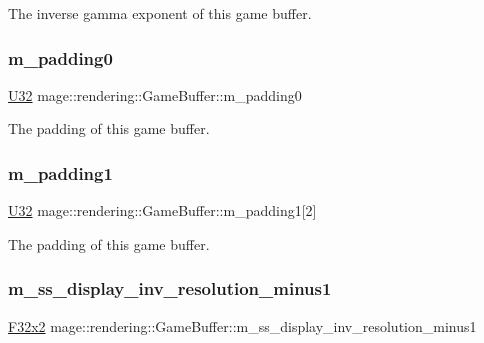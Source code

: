 The inverse gamma exponent of this game buffer. \hypertarget{structmage_1_1rendering_1_1_game_buffer_ac0e92071c7409a5408047bd6116da200}{}\label{structmage_1_1rendering_1_1_game_buffer_ac0e92071c7409a5408047bd6116da200} 
\subsubsection{\texorpdfstring{m\+\_\+padding0}{m\_padding0}}
{\footnotesize\ttfamily \hyperlink{namespacemage_a41c104c036fba3756a74e19f793eeaa1}{U32} mage\+::rendering\+::\+Game\+Buffer\+::m\+\_\+padding0}

The padding of this game buffer. \hypertarget{structmage_1_1rendering_1_1_game_buffer_a235dc002359e2106b4aee25e07470da8}{}\label{structmage_1_1rendering_1_1_game_buffer_a235dc002359e2106b4aee25e07470da8} 
\subsubsection{\texorpdfstring{m\+\_\+padding1}{m\_padding1}}
{\footnotesize\ttfamily \hyperlink{namespacemage_a41c104c036fba3756a74e19f793eeaa1}{U32} mage\+::rendering\+::\+Game\+Buffer\+::m\+\_\+padding1\mbox{[}2\mbox{]}}

The padding of this game buffer. \hypertarget{structmage_1_1rendering_1_1_game_buffer_a471b606cff83755f74f855c780c3dc2a}{}\label{structmage_1_1rendering_1_1_game_buffer_a471b606cff83755f74f855c780c3dc2a} 
\subsubsection{\texorpdfstring{m\+\_\+ss\+\_\+display\+\_\+inv\+\_\+resolution\+\_\+minus1}{m\_ss\_display\_inv\_resolution\_minus1}}
{\footnotesize\ttfamily \hyperlink{namespacemage_aa87237ad091f5cd7da612b8523fc108f}{F32x2} mage\+::rendering\+::\+Game\+Buffer\+::m\+\_\+ss\+\_\+display\+\_\+inv\+\_\+resolution\+\_\+minus1}

